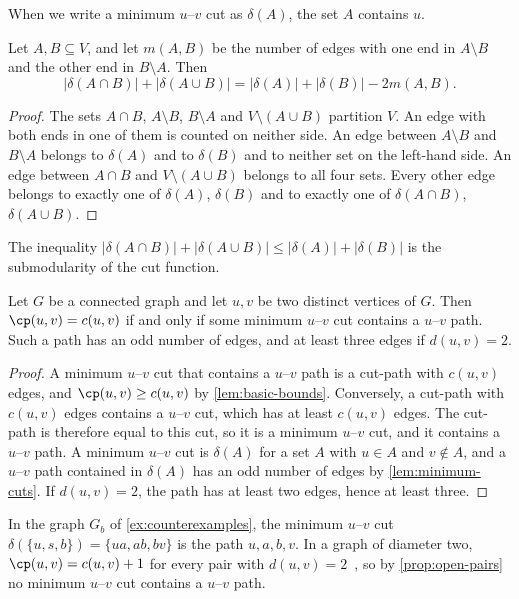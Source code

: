 When we write a minimum $u$--$v$ cut as $\delta(A)$, the set $A$ contains $u$.

\begin{lemma}
\label{lem:uncrossing}
Let $A, B \subseteq V$, and let $m(A, B)$ be the number of edges with one end in $A \setminus B$ and the other end in $B \setminus A$.
Then
\[
|\delta(A \cap B)| + |\delta(A \cup B)| = |\delta(A)| + |\delta(B)| - 2m(A, B).
\]
\end{lemma}

\begin{proof}
The sets $A \cap B$, $A \setminus B$, $B \setminus A$ and $V \setminus (A \cup B)$ partition $V$.
An edge with both ends in one of them is counted on neither side.
An edge between $A \setminus B$ and $B \setminus A$ belongs to $\delta(A)$ and to $\delta(B)$ and to neither set on the left-hand side.
An edge between $A \cap B$ and $V \setminus (A \cup B)$ belongs to all four sets.
Every other edge belongs to exactly one of $\delta(A)$, $\delta(B)$ and to exactly one of $\delta(A \cap B)$, $\delta(A \cup B)$.
\end{proof}

The inequality $|\delta(A \cap B)| + |\delta(A \cup B)| \leq |\delta(A)| + |\delta(B)|$ is the submodularity of the cut function.

\begin{proposition}
\label{prop:open-pairs}
Let $G$ be a connected graph and let $u, v$ be two distinct vertices of $G$.
Then $\cp(u, v) = c(u, v)$ if and only if some minimum $u$--$v$ cut contains a $u$--$v$ path.
Such a path has an odd number of edges, and at least three edges if $d(u, v) = 2$.
\end{proposition}

\begin{proof}
A minimum $u$--$v$ cut that contains a $u$--$v$ path is a cut-path with $c(u, v)$ edges, and $\cp(u, v) \geq c(u, v)$ by \cref{lem:basic-bounds}.
Conversely, a cut-path with $c(u, v)$ edges contains a $u$--$v$ cut, which has at least $c(u, v)$ edges.
The cut-path is therefore equal to this cut, so it is a minimum $u$--$v$ cut, and it contains a $u$--$v$ path.
A minimum $u$--$v$ cut is $\delta(A)$ for a set $A$ with $u \in A$ and $v \notin A$, and a $u$--$v$ path contained in $\delta(A)$ has an odd number of edges by \cref{lem:minimum-cuts}.
If $d(u, v) = 2$, the path has at least two edges, hence at least three.
\end{proof}

In the graph $G_b$ of \cref{ex:counterexamples}, the minimum $u$--$v$ cut $\delta(\{u, s, b\}) = \{ua, ab, bv\}$ is the path $u, a, b, v$.
In a graph of diameter two, $\cp(u, v) = c(u, v) + 1$ for every pair with $d(u, v) = 2$~\cite[Theorem~15]{Michel2025MinCutPath}, so by \cref{prop:open-pairs} no minimum $u$--$v$ cut contains a $u$--$v$ path.

